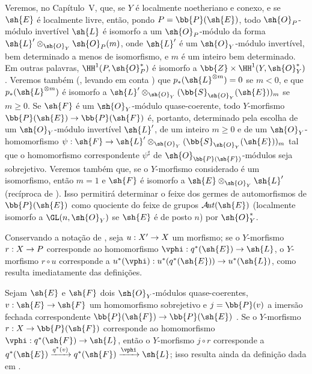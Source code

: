 \documentclass[oneside,10pt]{amsart}
\makeatletter
\renewcommand{\geq}{\geqslant}
\newcommand{\ega@arrow}[2]{\mathchoice{#1}{#2}{#2}{#2}}
\renewcommand{\to}{\ega@arrow{\longrightarrow}{\rightarrow}}
\def\shAut{\mathcal{A}\!\mathit{ut}}
\newcommand{\oldpage}[2][]{\marginnote{\normalfont\footnotesize\textbf{#1}~|~#2}\ignorespaces}
\let\EGAOriginalLabel\label
\renewcommand{\label}[1]{\phantomsection\EGAOriginalLabel{#1}}
\makeatother
\begin{document}
\begin{remark}[4.2.7]
\label{II.4.2.7}
Veremos, no Capítulo~V, que, se $Y$ é localmente noetheriano e conexo, e se $\sh{E}$ é localmente livre, então, pondo $P=\bb{P}(\sh{E})$, todo $\sh{O}_P$-módulo invertível $\sh{L}$ é isomorfo a um $\sh{O}_P$-módulo da forma $\sh{L}'\otimes_{\sh{O}_Y}\sh{O}_P(m)$, onde $\sh{L}'$ é um $\sh{O}_Y$-módulo invertível, bem determinado a menos de isomorfismo, e $m$ é um inteiro bem determinado.
Em outras palavras, $\HH^1(P,\sh{O}_P^*)$ é isomorfo a $\bb{Z}\times\HH^1(Y,\sh{O}_Y^*)$ .
Veremos também (, levando em conta ) que $p_*(\sh{L}^{\otimes m})=0$ se $m<0$, e que $p_*(\sh{L}^{\otimes m})$ é isomorfo a $\sh{L}'\otimes_{\sh{O}_Y}(\bb{S}_{\sh{O}_Y}(\sh{E}))_m$ se $m\geq0$.
Se $\sh{F}$ é um $\sh{O}_Y$-módulo quase-coerente, todo $Y$-morfismo $\bb{P}(\sh{E})\to\bb{P}(\sh{F})$ é, portanto, determinado pela escolha de um $\sh{O}_Y$-módulo invertível $\sh{L}'$, de um inteiro $m\geq0$ e de um $\sh{O}_Y$-homomorfismo $\psi:\sh{F}\to\sh{L}'\otimes_{\sh{O}_Y}(\bb{S}_{\sh{O}_Y}(\sh{E}))_m$ tal que o homomorfismo correspondente $\psi^\sharp$ de $\sh{O}_{\bb{P}(\sh{F})}$-módulos seja sobrejetivo.
Veremos também que, se o $Y$-morfismo considerado é um isomorfismo, então $m=1$ e $\sh{F}$ é isomorfo a $\sh{E}\otimes_{\sh{O}_Y}\sh{L}'$ (recíproca de ).
Isso permitirá determinar o feixe dos germes de automorfismos de $\bb{P}(\sh{E})$ como quociente do feixe de grupos $\shAut(\sh{E})$ (localmente isomorfo a $\GL(n,\sh{O}_Y)$ se $\sh{E}$ é de posto $n$) por $\sh{O}_Y^*$.
\end{remark}

\begin{env}[4.2.8]
\label{II.4.2.8}
Conservando a notação de , seja $u:X'\to X$ um morfismo;
se o $Y$-morfismo $r:X\to P$ corresponde ao homomorfismo $\vphi:q^*(\sh{E})\to\sh{L}$, o $Y$-morfismo $r\circ u$ corresponde a $u^*(\vphi):u^*(q^*(\sh{E}))\to u^*(\sh{L})$, como resulta imediatamente das definições.
\end{env}

\begin{env}[4.2.9]
\label{II.4.2.9}
Sejam $\sh{E}$ e $\sh{F}$ dois $\sh{O}_Y$-módulos quase-coerentes, $v:\sh{E}\to\sh{F}$ um homomorfismo sobrejetivo e $j=\bb{P}(v)$ a imersão fechada correspondente $\bb{P}(\sh{F})\to\bb{P}(\sh{E})$ .
Se o $Y$-morfismo $r:X\to\bb{P}(\sh{F})$ corresponde ao homomorfismo $\vphi:q^*(\sh{F})\to\sh{L}$, então o
\oldpage[II]{76}
$Y$-morfismo $j\circ r$ corresponde a $q^*(\sh{E})\xrightarrow{q^*(v)}q^*(\sh{F})\xrightarrow{\vphi}\sh{L}$;
isso resulta ainda da definição dada em .
\end{env}
\end{document}
